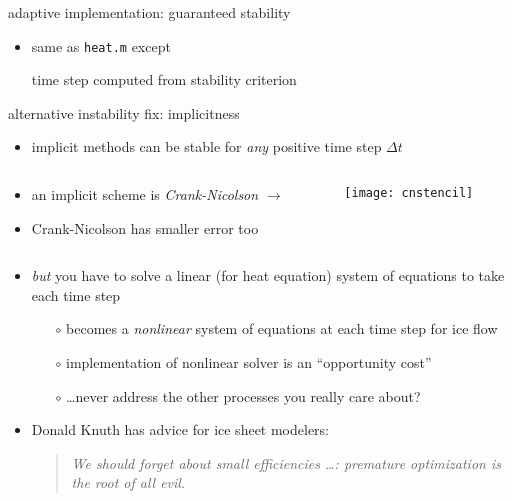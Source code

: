 \begin{frame}{adaptive implementation: guaranteed stability}


\begin{itemize}
\item same as \texttt{heat.m} except

\begin{center}
\alert{time step computed from stability criterion}
\end{center}
\end{itemize}\end{frame}


\begin{frame}{alternative instability fix: implicitness}

\begin{itemize}
\item \alert{implicit} methods can be stable for \emph{any} positive time step $\Delta t$
\end{itemize}

\begin{columns}
\begin{column}{0.7\textwidth}
\begin{itemize}
\item an implicit scheme is \emph{Crank-Nicolson} $\longrightarrow$
\item Crank-Nicolson has smaller error too
\end{itemize}
\normalsize
\end{column}
\begin{column}{0.3\textwidth}
\texttt{[image: cnstencil]}
\end{column}
\end{columns}

\begin{itemize}
\item \emph{but} you have to solve a linear (for heat equation) system of equations to take each time step
  \small
  \begin{itemize}
  \item[$\circ$] becomes a \emph{nonlinear} system of equations at each time step for ice flow
  \item[$\circ$] implementation of nonlinear solver is an ``opportunity cost''
  \item[$\circ$] \dots never address the other processes you really care about?
  \end{itemize}

\bigskip
\item Donald Knuth has advice for ice sheet modelers: \begin{quote}
\emph{We should forget about small efficiencies \dots: premature optimization is the root of all evil}.
\end{quote}
\end{itemize}
\end{frame}


